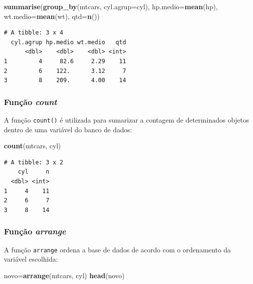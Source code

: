 \documentclass[12pt,brazil,oneside]{book}
\newenvironment{Shaded}{\begin{snugshade}}{\end{snugshade}}
\newcommand{\DataTypeTok}[1]{\textcolor[rgb]{0.13,0.29,0.53}{#1}}
\newcommand{\KeywordTok}[1]{\textcolor[rgb]{0.13,0.29,0.53}{\textbf{#1}}}
\newcommand{\NormalTok}[1]{#1}
\begin{document}
\begin{Shaded}
\begin{Highlighting}[]
\KeywordTok{summarise}\NormalTok{(}\KeywordTok{group_by}\NormalTok{(mtcars, }\DataTypeTok{cyl.agrup=}\NormalTok{cyl), }
          \DataTypeTok{hp.medio=}\KeywordTok{mean}\NormalTok{(hp), }
          \DataTypeTok{wt.medio=}\KeywordTok{mean}\NormalTok{(wt),}
          \DataTypeTok{qtd=}\KeywordTok{n}\NormalTok{())}
\end{Highlighting}
\end{Shaded}

\begin{verbatim}
# A tibble: 3 x 4
  cyl.agrup hp.medio wt.medio   qtd
      <dbl>    <dbl>    <dbl> <int>
1         4     82.6     2.29    11
2         6    122.      3.12     7
3         8    209.      4.00    14
\end{verbatim}

\hypertarget{funcao-count}{%
\subsubsection{\texorpdfstring{Função \emph{count}}{Função count}}\label{funcao-count}}

A função \texttt{count()} é utilizada para sumarizar a contagem de determinados objetos dentro de uma variável do banco de dados:

\begin{Shaded}
\begin{Highlighting}[]
\KeywordTok{count}\NormalTok{(mtcars, cyl)}
\end{Highlighting}
\end{Shaded}

\begin{verbatim}
# A tibble: 3 x 2
    cyl     n
  <dbl> <int>
1     4    11
2     6     7
3     8    14
\end{verbatim}

\hypertarget{funcao-arrange}{%
\subsubsection{\texorpdfstring{Função \emph{arrange}}{Função arrange}}\label{funcao-arrange}}

A função \texttt{arrange} ordena a base de dados de acordo com o ordenamento da variável escolhida:

\begin{Shaded}
\begin{Highlighting}[]
\NormalTok{novo=}\KeywordTok{arrange}\NormalTok{(mtcars, cyl)}
\KeywordTok{head}\NormalTok{(novo)}
\end{Highlighting}
\end{Shaded}
\end{document}
